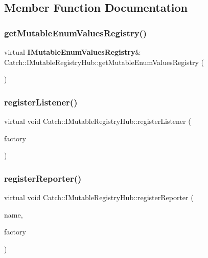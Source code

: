 \subsection{Member Function Documentation}
\mbox{\label{struct_catch_1_1_i_mutable_registry_hub_ab91c4fd63eeb0efd9bfb270e8bbd231d}} 
\subsubsection{getMutableEnumValuesRegistry()}
{\footnotesize\ttfamily virtual \textbf{ I\+Mutable\+Enum\+Values\+Registry}\& Catch\+::\+I\+Mutable\+Registry\+Hub\+::get\+Mutable\+Enum\+Values\+Registry (\begin{DoxyParamCaption}{ }\end{DoxyParamCaption})\hspace{0.3cm}{\ttfamily [pure virtual]}}

\mbox{\label{struct_catch_1_1_i_mutable_registry_hub_abd892a133f85581fd00ee75bb379ca56}} 
\subsubsection{registerListener()}
{\footnotesize\ttfamily virtual void Catch\+::\+I\+Mutable\+Registry\+Hub\+::register\+Listener (\begin{DoxyParamCaption}\item[{\textbf{ I\+Reporter\+Factory\+Ptr} const \&}]{factory }\end{DoxyParamCaption})\hspace{0.3cm}{\ttfamily [pure virtual]}}

\mbox{\label{struct_catch_1_1_i_mutable_registry_hub_a1c0ac202ac31ee9f88e8ff5cbac4b243}} 
\subsubsection{registerReporter()}
{\footnotesize\ttfamily virtual void Catch\+::\+I\+Mutable\+Registry\+Hub\+::register\+Reporter (\begin{DoxyParamCaption}\item[{std\+::string const \&}]{name,  }\item[{\textbf{ I\+Reporter\+Factory\+Ptr} const \&}]{factory }\end{DoxyParamCaption})\hspace{0.3cm}{\ttfamily [pure virtual]}}

